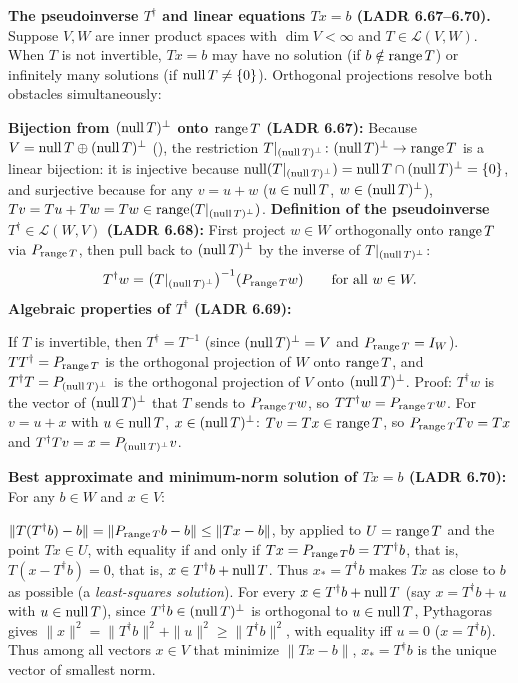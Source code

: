 \documentclass[10pt]{scrartcl}
\newcommand{\LL}{\mathcal L}\newcommand{\PP}{\mathcal P}\newcommand{\MM}{\mathcal M}
\begin{document}
\textbf{The pseudoinverse $T^\dagger$ and linear equations $Tx=b$ (LADR 6.67--6.70).} Suppose $V,W$ are inner product spaces with $\dim V<\infty$ and $T\in\LL(V,W)$. When $T$ is not invertible, $Tx=b$ may have no solution (if $b\notin\operatorname{range} T$) or infinitely many solutions (if $\operatorname{null} T\ne\{0\}$). Orthogonal projections resolve both obstacles simultaneously:
\begin{itemize}
  \ii \textbf{Bijection from $(\operatorname{null} T)^\perp$ onto $\operatorname{range} T$ (LADR 6.67):} Because $V=\operatorname{null} T\oplus(\operatorname{null} T)^\perp$ (), the restriction $T|_{(\operatorname{null} T)^\perp}\colon(\operatorname{null} T)^\perp\to\operatorname{range} T$ is a linear bijection: it is injective because $\operatorname{null}(T|_{(\operatorname{null} T)^\perp})=\operatorname{null} T\cap(\operatorname{null} T)^\perp=\{0\}$, and surjective because for any $v=u+w$ ($u\in\operatorname{null} T$, $w\in(\operatorname{null} T)^\perp$), $Tv=Tu+Tw=Tw\in\operatorname{range}(T|_{(\operatorname{null} T)^\perp})$.
  \ii \textbf{Definition of the pseudoinverse $T^\dagger\in\LL(W,V)$ (LADR 6.68):} First project $w\in W$ orthogonally onto $\operatorname{range} T$ via $P_{\operatorname{range} T}$, then pull back to $(\operatorname{null} T)^\perp$ by the inverse of $T|_{(\operatorname{null} T)^\perp}$:
  \[
    T^\dagger w = \big(T|_{(\operatorname{null} T)^\perp}\big)^{-1}(P_{\operatorname{range} T}w) \qquad\text{for all }w\in W.
  \]
  \ii \textbf{Algebraic properties of $T^\dagger$ (LADR 6.69):}
  \begin{enumerate}[(a)]
    \ii If $T$ is invertible, then $T^\dagger = T^{-1}$ (since $(\operatorname{null} T)^\perp=V$ and $P_{\operatorname{range} T}=I_W$).
    \ii $TT^\dagger = P_{\operatorname{range} T}$ is the orthogonal projection of $W$ onto $\operatorname{range} T$, and $T^\dagger T = P_{(\operatorname{null} T)^\perp}$ is the orthogonal projection of $V$ onto $(\operatorname{null} T)^\perp$. Proof: $T^\dagger w$ is the vector of $(\operatorname{null} T)^\perp$ that $T$ sends to $P_{\operatorname{range} T}w$, so $TT^\dagger w=P_{\operatorname{range} T}w$. For $v=u+x$ with $u\in\operatorname{null} T$, $x\in(\operatorname{null} T)^\perp$: $Tv=Tx\in\operatorname{range} T$, so $P_{\operatorname{range} T}Tv=Tx$ and $T^\dagger Tv=x=P_{(\operatorname{null} T)^\perp}v$.
  \end{enumerate}
  \ii \textbf{Best approximate and minimum-norm solution of $Tx=b$ (LADR 6.70):} For any $b\in W$ and $x\in V$:
  \begin{enumerate}[(a)]
    \ii $\|T(T^\dagger b)-b\| = \|P_{\operatorname{range} T}b-b\| \le \|Tx-b\|$, by  applied to $U=\operatorname{range} T$ and the point $Tx\in U$, with equality if and only if $Tx=P_{\operatorname{range} T}b=TT^\dagger b$, that is, $T(x-T^\dagger b)=0$, that is, $x\in T^\dagger b+\operatorname{null} T$. Thus $x_*=T^\dagger b$ makes $Tx$ as close to $b$ as possible (a \emph{least-squares solution}).
    \ii For every $x\in T^\dagger b+\operatorname{null} T$ (say $x=T^\dagger b+u$ with $u\in\operatorname{null} T$), since $T^\dagger b\in(\operatorname{null} T)^\perp$ is orthogonal to $u\in\operatorname{null} T$, Pythagoras gives $\|x\|^2=\|T^\dagger b\|^2+\|u\|^2\ge\|T^\dagger b\|^2$, with equality iff $u=0$ ($x=T^\dagger b$). Thus among all vectors $x\in V$ that minimize $\|Tx-b\|$, $x_*=T^\dagger b$ is the unique vector of smallest norm.
  \end{enumerate}
\end{itemize}
\end{document}
